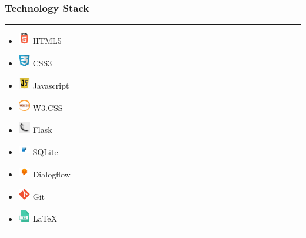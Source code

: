 \documentclass[14pt]{beamer}
\begin{document}
\begin{frame}
    \frametitle{Technology Stack}
    \noindent
    {\color{pink} \rule{\linewidth}{0.7mm} }
    \begin{itemize}
        \item [] \includegraphics[width=0.2in, height=0.2in]{./Codiac/logos/html.png} HTML5 \\
            \pause
        \item [] \includegraphics[width=0.2in, height=0.2in]{./Codiac/logos/css.png} CSS3 \\
            \pause
        \item [] \includegraphics[width=0.2in, height=0.2in]{./Codiac/logos/java.png} Javascript \\
            \pause
        \item [] \includegraphics[width=0.2in, height=0.2in]{./Codiac/logos/w3.png} W3.CSS \\
            \pause
        \item [] \includegraphics[width=0.2in, height=0.2in]{./Codiac/logos/flask.jpg} Flask \\
            \pause
        \item [] \includegraphics[width=0.2in, height=0.2in]{./Codiac/logos/sqllite.png} SQLite \\
            \pause
        \item [] \includegraphics[width=0.2in, height=0.2in]{./Codiac/logos/dialogflow.jpg} Dialogflow \\
            \pause
        \item [] \includegraphics[width=0.2in, height=0.2in]{./Codiac/logos/git.png} Git \\
            \pause
        \item [] \includegraphics[width=0.2in, height=0.2in]{./Codiac/logos/latex.png} LaTeX \\
    \end{itemize}
\noindent
    {\color{pink} \rule{\linewidth}{0.7mm} }
\end{frame}
\end{document}
